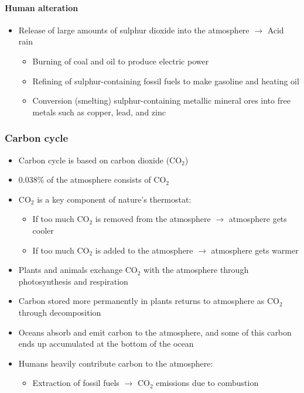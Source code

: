 \documentclass{article}
\begin{document}
\paragraph{Human alteration}
\begin{itemize}
    \item Release of large amounts of sulphur dioxide into the atmosphere $\rightarrow$ Acid rain
    \begin{itemize}
        \item Burning of coal and oil to produce electric power
        \item Refining of sulphur-containing fossil fuels to make gasoline and heating oil
        \item Conversion (smelting) sulphur-containing metallic mineral ores into free metals such as copper, lead, and zinc
    \end{itemize}
\end{itemize}

\subsubsection{Carbon cycle}
\begin{itemize}
    \item Carbon cycle is based on carbon dioxide (CO$_2$)
    \item 0.038\% of the atmosphere consists of CO$_2$
    \item CO$_2$ is a key component of nature’s thermostat:
    \begin{itemize}
        \item If too much CO$_2$ is removed from the atmosphere $\rightarrow$ atmosphere gets cooler
        \item If too much CO$_2$ is added to the atmosphere $\rightarrow$ atmosphere gets warmer
    \end{itemize}
    \item Plants and animals exchange CO$_2$ with the atmosphere through photosynthesis and respiration
    \item Carbon stored more permanently in plants returns to atmosphere as CO$_2$ through decomposition
    \item Oceans absorb and emit carbon to the atmosphere, and some of this carbon ends up accumulated at the bottom of the ocean
    \item Humans heavily contribute carbon to the atmosphere:
    \begin{itemize}
        \item Extraction of fossil fuels $\rightarrow$ CO$_2$ emissions due to combustion
    \end{itemize}
\end{itemize}
\end{document}
